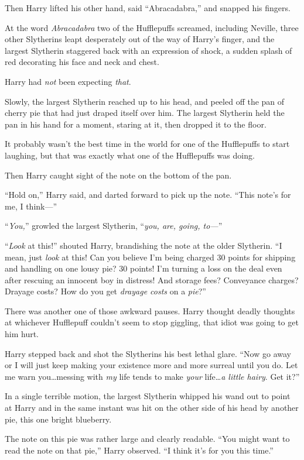 Then Harry lifted his other hand, said “Abracadabra,” and snapped his fingers.

At the word \emph{Abracadabra} two of the Hufflepuffs screamed, including Neville, three other Slytherins leapt desperately out of the way of Harry’s finger, and the largest Slytherin staggered back with an expression of shock, a sudden splash of red decorating his face and neck and chest.

Harry had \emph{not} been expecting \emph{that}.

Slowly, the largest Slytherin reached up to his head, and peeled off the pan of cherry pie that had just draped itself over him. The largest Slytherin held the pan in his hand for a moment, staring at it, then dropped it to the floor.

It probably wasn’t the best time in the world for one of the Hufflepuffs to start laughing, but that was exactly what one of the Hufflepuffs was doing.

Then Harry caught sight of the note on the bottom of the pan.

“Hold on,” Harry said, and darted forward to pick up the note. “This note’s for me, I think—”

“\emph{You,}” growled the largest Slytherin, “\emph{you, are, going, to—}”

“\emph{Look} at this!” shouted Harry, brandishing the note at the older Slytherin. “I mean, just \emph{look} at this! Can you believe I’m being charged 30 points for shipping and handling on one lousy pie? 30 points! I’m turning a loss on the deal even after rescuing an innocent boy in distress! And storage fees? Conveyance charges? Drayage costs? How do you get \emph{drayage costs} on a \emph{pie}?”

There was another one of those awkward pauses. Harry thought deadly thoughts at whichever Hufflepuff couldn’t seem to stop giggling, that idiot was going to get him hurt.

Harry stepped back and shot the Slytherins his best lethal glare. “Now go away or I will just keep making your existence more and more surreal until you do. Let me warn you…messing with \emph{my} life tends to make \emph{your} life…\emph{a little hairy}. Get it?”

In a single terrible motion, the largest Slytherin whipped his wand out to point at Harry and in the same instant was hit on the other side of his head by another pie, this one bright blueberry.

The note on this pie was rather large and clearly readable. “You might want to read the note on that pie,” Harry observed. “I think it’s for you this time.”

